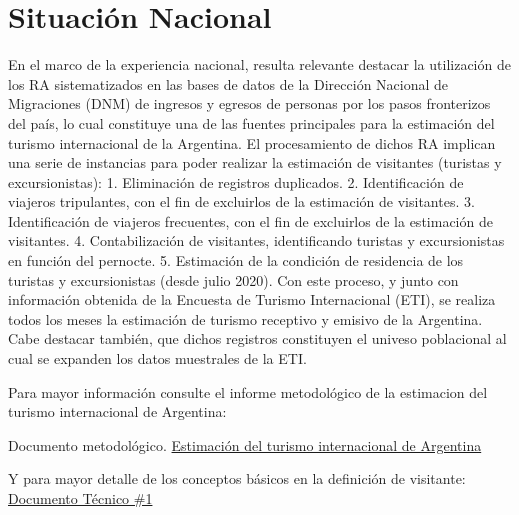 \documentclass[
]{book}
\begin{document}
\hypertarget{situaciuxf3n-nacional}{%
\section{Situación Nacional}\label{situaciuxf3n-nacional}}

En el marco de la experiencia nacional, resulta relevante destacar la utilización de los RA sistematizados en las bases de datos de la Dirección Nacional de Migraciones (DNM) de ingresos y egresos de personas por los pasos fronterizos del país, lo cual constituye una de las fuentes principales para la estimación del turismo internacional de la Argentina. El procesamiento de dichos RA implican una serie de instancias para poder realizar la estimación de visitantes (turistas y excursionistas):
1. Eliminación de registros duplicados.
2. Identificación de viajeros tripulantes, con el fin de excluirlos de la estimación de visitantes.
3. Identificación de viajeros frecuentes, con el fin de excluirlos de la estimación de visitantes.
4. Contabilización de visitantes, identificando turistas y excursionistas en función del pernocte.
5. Estimación de la condición de residencia de los turistas y excursionistas (desde julio 2020).
Con este proceso, y junto con información obtenida de la Encuesta de Turismo Internacional (ETI), se realiza todos los meses la estimación de turismo receptivo y emisivo de la Argentina. Cabe destacar también, que dichos registros constituyen el univeso poblacional al cual se expanden los datos muestrales de la ETI.

Para mayor información consulte el informe metodológico de la estimacion del turismo internacional de Argentina:

Documento metodológico. \href{https://www.yvera.tur.ar/estadistica/documentos/descarga/5dc0460bcfa3e053142696.pdf}{Estimación del turismo internacional de Argentina}

Y para mayor detalle de los conceptos básicos en la definición de visitante: \href{https://dnme-minturdep.github.io/DT1_medicion_turismo/flujo-turistico.html\#medici\%C3\%B3n}{Documento Técnico \#1}
\end{document}
